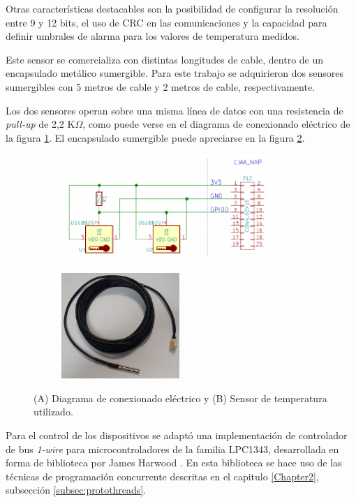 Otras características destacables son la posibilidad de configurar la resolución entre 9 y 12 bits, el uso de CRC en las comunicaciones y la capacidad para definir umbrales de alarma para los valores de temperatura medidos.

Este sensor se comercializa con distintas longitudes de cable, dentro de un encapsulado metálico sumergible.  Para este trabajo se adquirieron dos sensores sumergibles con 5 metros de cable y 2 metros de cable, respectivamente.   

Los dos sensores operan sobre una misma línea de datos con una resistencia de \textit{pull-up} de 2,2 K$\Omega$, como puede verse en el diagrama de conexionado eléctrico de la figura \ref{fig:ds18b20_conexionado}.  El encapsulado sumergible puede apreciarse en la figura \ref{fig:termometro}.


\begin{figure}[htpb]
	\centering
	\begin{subfigure}{.6\textwidth}
		\centering
		\includegraphics[height=4cm]{./Figures/ds18b20_conexionado.pdf}
		\caption{ }
  		\label{fig:ds18b20_conexionado}
	\end{subfigure}%
	\begin{subfigure}{.4\textwidth}
		\centering
		\includegraphics[height=4cm]{./Figures/ds18b20.jpg}
		\caption{ }
		\label{fig:termometro}
	\end{subfigure}
	\caption{(A) Diagrama de conexionado eléctrico y (B) Sensor de temperatura utilizado.}
	\label{fig:ds18b20}
\end{figure}

\clearpage
Para el control de los dispositivos se adaptó una implementación de controlador de bus \textit{1-wire} para microcontroladores de la familia LPC1343, desarrollada en forma de biblioteca por James Harwood \citep{harwood}.  En esta biblioteca se hace uso de las técnicas de programación concurrente descritas en el capitulo \ref{Chapter2}, subsección \ref{subsec:protothreads}.

